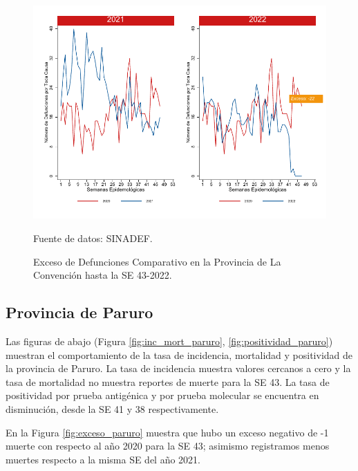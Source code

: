 \documentclass[12pt,a4paper,openany]{book}
\begin{document}
	\begin{figure}[h]
		\caption{Exceso de Defunciones Comparativo en la Provincia de La Convención hasta la SE 43-2022.}\label{fig:exceso_laconv}
		\begin{center}
			\includegraphics[width=0.7\linewidth]{../figuras/exceso_9.pdf}
		\end{center}
		{\footnotesize {Fuente de datos: SINADEF.}}
	\end{figure}
	
	\clearpage
	
	\subsection*{Provincia de Paruro}
	\noindent Las figuras de abajo (Figura \ref{fig:inc_mort_paruro}, \ref{fig:positividad_paruro}) muestran el comportamiento de la tasa de incidencia, mortalidad y positividad de la provincia de Paruro. La tasa de incidencia muestra valores cercanos a cero y la tasa de mortalidad no muestra reportes de muerte para la SE 43. La tasa de positividad por prueba antigénica y por prueba molecular se encuentra en disminución, desde la SE 41 y 38 respectivamente.
	
	En la Figura \ref{fig:exceso_paruro} muestra que hubo un exceso negativo de -1 muerte con respecto al año 2020 para la SE 43; asimismo registramos menos  muertes respecto a la misma SE del año 2021.
	
\end{document}
